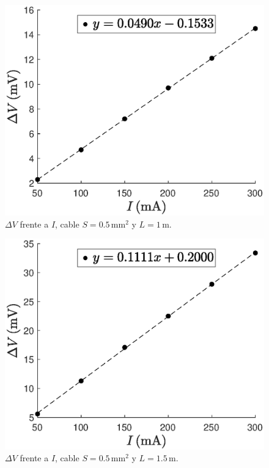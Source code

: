 \begin{figure}[h!]
    \begin{center}
        \includegraphics[width=0.8\columnwidth]{files/images/S2L1}
    \end{center}
    \caption{$\Delta V$ frente a $I$, cable $S = 0.5\,$mm$^2$ y $L = 1\,$m.}
    \label{fig:S2L1}
\end{figure}

\begin{figure}[h!]
    \begin{center}
        \includegraphics[width=0.8\columnwidth]{files/images/S2L2}
    \end{center}
    \caption{$\Delta V$ frente a $I$, cable $S = 0.5\,$mm$^2$ y $L = 1.5\,$m.}
    \label{fig:S2L2}
\end{figure}

